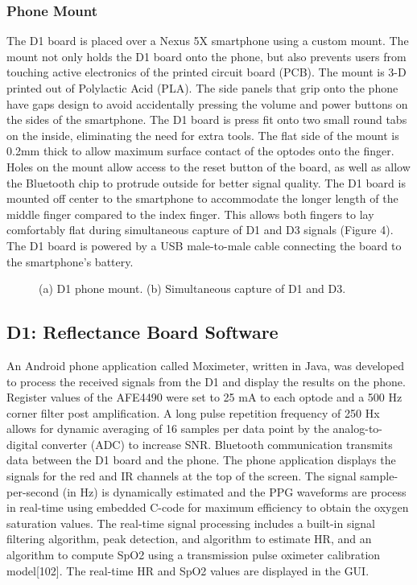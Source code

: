        \subsubsection{Phone Mount}
        The D1 board is placed over a Nexus 5X smartphone using a custom mount. The mount not only holds the D1 board onto the phone, but also prevents users from touching active electronics of the printed circuit board (PCB). The mount is 3-D printed out of Polylactic Acid (PLA). The side panels that grip onto the phone have gaps design to avoid accidentally pressing the volume and power buttons on the sides of the smartphone. The D1 board is press fit onto two small round tabs on the inside, eliminating the need for extra tools. The flat side of the mount is 0.2mm thick to allow maximum surface contact of the optodes onto the finger. Holes on the mount allow access to the reset button of the board, as well as allow the Bluetooth chip to protrude outside for better signal quality. The D1 board is mounted off center to the smartphone to accommodate the longer length of the middle finger compared to the index finger. This allows both fingers to lay comfortably flat during simultaneous capture of D1 and D3 signals (Figure 4). The D1 board is powered by a USB male-to-male cable connecting the board to the smartphone’s battery. 

        \begin{figure}
        	\begin{center}
        	\end{center}
        	\caption{(a) D1 phone mount. (b) Simultaneous capture of D1 and D3.} 
        	\label{fig:xx}
        \end{figure} 
        
    \subsection{D1: Reflectance Board Software}
    An Android phone application called Moximeter, written in Java, was developed to process the received signals from the D1 and display the results on the phone. Register values of the AFE4490 were set to 25 mA to each optode and a 500 Hz corner filter post amplification. A long pulse repetition frequency of 250 Hx allows for dynamic averaging of 16 samples per data point by the analog-to-digital converter (ADC) to increase SNR. Bluetooth communication transmits data between the D1 board and the phone. The phone application displays the signals for the red and IR channels at the top of the screen. The signal sample-per-second (in Hz) is dynamically estimated and the PPG waveforms are process in real-time using embedded C-code for maximum efficiency to obtain the oxygen saturation values. The real-time signal processing includes a built-in signal filtering algorithm, peak detection, and algorithm to estimate HR, and an algorithm to compute SpO2 using a transmission pulse oximeter calibration model[102]. The real-time HR and SpO2 values are displayed in the GUI. 
    
